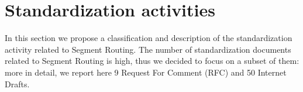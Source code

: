 \section{Standardization activities}
\label{sec:standard}
\begin{comment}

\begin{itemize}
    \item Describe all the standardization activities
    \item A first list can be found here http://www.segment-routing.net/ietf/ 
    \item Complete the section with the new drafts not listed above
\end{itemize}
\end{comment}
In this section we propose a classification and description of the standardization activity related to Segment Routing. The number of standardization documents related to Segment Routing is high, thus we decided to focus on a subset of them: more in detail, we report here 9 Request For Comment (RFC) and 50 Internet Drafts.

